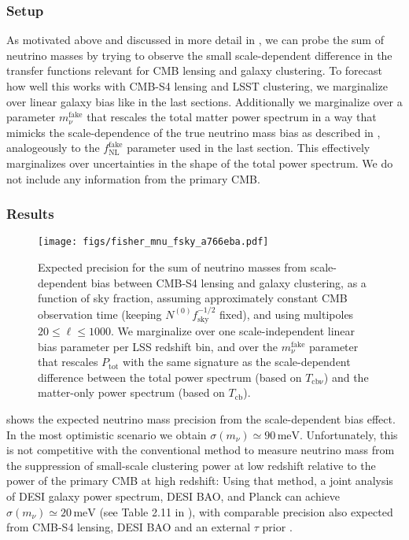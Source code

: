 \documentclass[prd,superscriptaddress,floatfix,notitlepage,nofootinbib,reprint]{revtex4-1} %
\begin{document}
\subsubsection{Setup}
As motivated above and discussed in more detail in , we can probe the sum of neutrino masses by trying to observe the small scale-dependent difference in the transfer functions relevant for CMB lensing and galaxy clustering.
To forecast how well this works with CMB-S4 lensing and LSST clustering, we marginalize over linear galaxy bias like in the last sections. 
Additionally we marginalize over a parameter $m_\nu^\mathrm{fake}$ that rescales the total matter power spectrum in a way that mimicks the scale-dependence of the true neutrino mass bias as described in , analogeously to the $f_\mathrm{NL}^\mathrm{fake}$ parameter used in the last section.  This effectively marginalizes over uncertainties in the shape of the total power spectrum.
We do not include any information from the primary CMB.


\subsubsection{Results}


\begin{figure}[tbp]
\texttt{[image: figs/fisher\_mnu\_fsky\_a766eba.pdf]}
\caption{
Expected precision for the sum of neutrino masses from scale-dependent bias between CMB-S4 lensing and galaxy clustering, as a function of sky fraction, assuming approximately constant CMB observation time (keeping $N^{(0)}f_\mathrm{sky}^{-1/2}$ fixed), and using multipoles $20\le \ell\le 1000$.
We marginalize over one scale-independent linear bias parameter per LSS redshift bin, and over  the $m_\nu^\mathrm{fake}$ parameter that rescales $P_\mathrm{tot}$ with the same signature as the scale-dependent difference between the total power spectrum (based on $T_\mathrm{cb\nu}$) and the matter-only power spectrum (based on $T_\mathrm{cb}$).
}
\label{fig:mnu_fsky}
\end{figure}


 shows the expected neutrino mass precision from the scale-dependent bias effect.
In the most optimistic scenario we obtain $\sigma(m_\nu)\simeq 90\,\mathrm{meV}$.
Unfortunately, this is not competitive with the conventional method to measure neutrino mass from the suppression of small-scale clustering power at low redshift relative to the power of the primary CMB at high redshift:  
Using that method, a joint analysis of DESI galaxy power spectrum, DESI BAO, and Planck can achieve $\sigma(m_\nu)\simeq 20\,\mathrm{meV}$ (see Table 2.11 in \cite{DESIFDRDoc}),
with comparable precision also expected from CMB-S4 lensing, DESI BAO and an external $\tau$ prior \cite{CMBS4SciBook}.
\end{document}
